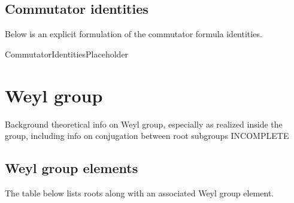 \documentclass[11pt]{article}
\newcommand{\noi}{\noindent}
\theoremstyle{definition}
\begin{document}
\subsection{Commutator identities}

\noi Below is an explicit formulation of the commutator formula identities.

\bigskip

\noi CommutatorIdentitiesPlaceholder
\fi

\newpage
\section{Weyl group}

\noi Background theoretical info on Weyl group, especially as realized inside the group, including info on conjugation between root subgroups INCOMPLETE

\subsection{Weyl group elements}

\noi The table below lists roots along with an associated Weyl group element.

\bigskip
\end{document}
